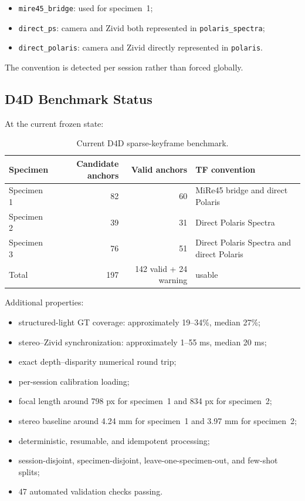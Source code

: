 \documentclass[11pt,a4paper]{article}
\begin{document}
\begin{itemize}[leftmargin=*]
    \item \texttt{mire45\_bridge}: used for specimen~1;
    \item \texttt{direct\_ps}: camera and Zivid both represented in
    \texttt{polaris\_spectra};
    \item \texttt{direct\_polaris}: camera and Zivid directly represented in
    \texttt{polaris}.
\end{itemize}

The convention is detected per session rather than forced globally.

\subsection{D4D Benchmark Status}

At the current frozen state:

\begin{table}[h]
\centering
\caption{Current D4D sparse-keyframe benchmark.}
\small
\begin{tabularx}{\textwidth}{
    >{\raggedright\arraybackslash}X
    r
    r
    >{\raggedright\arraybackslash}X
}
\toprule
\textbf{Specimen}
& \textbf{Candidate anchors}
& \textbf{Valid anchors}
& \textbf{TF convention} \\
\midrule
Specimen 1
& 82
& 60
& MiRe45 bridge and direct Polaris \\

Specimen 2
& 39
& 31
& Direct Polaris Spectra \\

Specimen 3
& 76
& 51
& Direct Polaris Spectra and direct Polaris \\
\midrule
Total
& 197
& 142 valid + 24 warning
& 166 usable \\
\bottomrule
\end{tabularx}
\end{table}

Additional properties:

\begin{itemize}[leftmargin=*]
    \item structured-light GT coverage: approximately 19--34\%, median 27\%;
    \item stereo--Zivid synchronization: approximately 1--55 ms, median 20 ms;
    \item exact depth--disparity numerical round trip;
    \item per-session calibration loading;
    \item focal length around 798 px for specimen~1 and 834 px for specimen~2;
    \item stereo baseline around 4.24 mm for specimen~1 and 3.97 mm for specimen~2;
    \item deterministic, resumable, and idempotent processing;
    \item session-disjoint, specimen-disjoint, leave-one-specimen-out, and few-shot
    splits;
    \item 47 automated validation checks passing.
\end{itemize}
\end{document}
